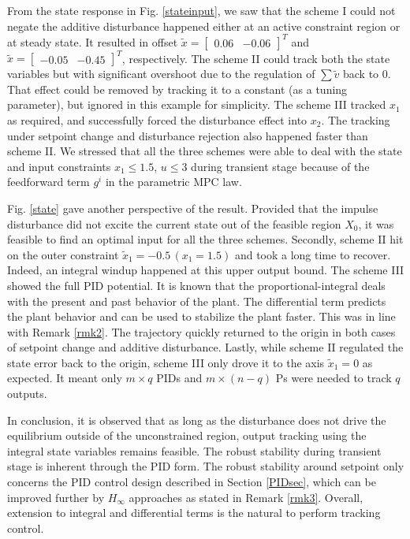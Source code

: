 \documentclass[5p,authoryear,times]{elsarticle}
\begin{document}
From the state response in Fig. \ref{stateinput}, we saw that the scheme I could not negate the additive disturbance happened either at an active constraint region or at steady state. It resulted in offset $\tilde{x}=\begin{bmatrix}0.06& -0.06\end{bmatrix}^T$ and $\tilde{x}=\begin{bmatrix}-0.05& -0.45\end{bmatrix}^T$, respectively. The scheme II could track both the state variables but with significant overshoot due to the regulation of $\sum{\tilde{v}}$ back to 0. That effect could be removed by tracking it to a constant (as a tuning parameter), but ignored in this example for simplicity. The scheme III tracked $x_1$ as required, and successfully forced the disturbance effect into $x_2$. The tracking under setpoint change and disturbance rejection also happened faster than scheme II. We stressed that all the three schemes were able to deal with the state and input constraints $x_1\leq 1.5$, $u\leq 3$ during transient stage because of the feedforward term $g^i$ in the parametric MPC law.

Fig. \ref{state} gave another perspective of the result. Provided that the impulse disturbance did not excite the current state out of the feasible region $X_0$, it was feasible to find an optimal input for all the three schemes. Secondly, scheme II hit on the outer constraint $\tilde{x}_1=-0.5\, (x_1=1.5)$ and took a long time to recover. Indeed, an integral windup happened at this upper output bound. The scheme III showed the full PID potential. It is known that the proportional-integral deals with the present and past behavior of the plant. The differential term predicts the plant behavior and can be used to stabilize the plant faster. This was in line with Remark \ref{rmk2}. The trajectory quickly returned to the origin in both cases of setpoint change and additive disturbance. Lastly, while scheme II regulated the state error back to the origin, scheme III only drove it to the axis $\tilde{x}_1=0$ as expected. It meant only $m\times q$ PIDs and $m\times (n-q)$ Ps were needed to track $q$ outputs.

In conclusion, it is observed that as long as the disturbance does not drive the equilibrium outside of the unconstrained region, output tracking using the integral state variables remains feasible. The robust stability during transient stage is inherent through the PID form. The robust stability around setpoint only concerns the PID control design described in Section \ref{PIDsec}, which can be improved further by $H_\infty$ approaches as stated in Remark \ref{rmk3}. Overall, extension to integral and differential terms is the natural to perform tracking control.
\end{document}
